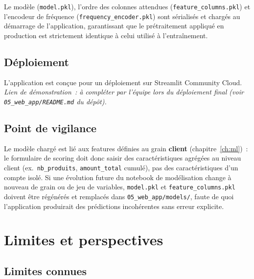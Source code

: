 \documentclass[11pt,a4paper]{report}
\begin{document}
Le mod\`ele (\texttt{model.pkl}), l'ordre des colonnes attendues
(\texttt{feature\_columns.pkl}) et l'encodeur de fr\'equence
(\texttt{frequency\_encoder.pkl}) sont s\'erialis\'es et charg\'es au d\'emarrage de
l'application, garantissant que le pr\'etraitement appliqu\'e en production est
strictement identique \`a celui utilis\'e \`a l'entra\^inement.

\section{D\'eploiement}

L'application est con\c{c}ue pour un d\'eploiement sur Streamlit Community
Cloud. \emph{Lien de d\'emonstration~: \`a compl\'eter par l'\'equipe lors du
d\'eploiement final (voir \texttt{05\_web\_app/README.md} du d\'ep\^ot).}

\section{Point de vigilance}

Le mod\`ele charg\'e est li\'e aux features d\'efinies au grain \textbf{client}
(chapitre~\ref{ch:ml})~: le formulaire de scoring doit donc saisir des
caract\'eristiques agr\'eg\'ees au niveau client (ex.\ \texttt{nb\_produits},
\texttt{amount\_total} cumul\'e), pas des caract\'eristiques d'un compte isol\'e.
Si une \'evolution future du notebook de mod\'elisation change \`a nouveau de
grain ou de jeu de variables, \texttt{model.pkl} et
\texttt{feature\_columns.pkl} doivent \^etre r\'eg\'en\'er\'es et remplac\'es dans
\texttt{05\_web\_app/models/}, faute de quoi l'application produirait des
pr\'edictions incoh\'erentes sans erreur explicite.

\chapter{Limites et perspectives}
\label{ch:limites}

\section{Limites connues}
\end{document}
